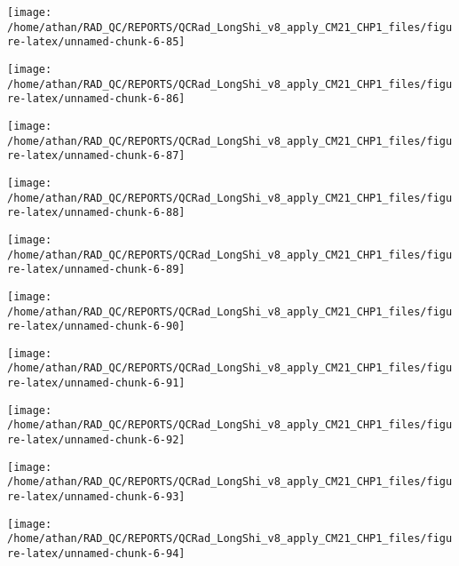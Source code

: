 \documentclass[
  10pt,
  a4paper,oneside]{article}
\begin{document}
\begin{center}\texttt{[image: /home/athan/RAD\_QC/REPORTS/QCRad\_LongShi\_v8\_apply\_CM21\_CHP1\_files/figure-latex/unnamed-chunk-6-85]} \end{center}

\begin{center}\texttt{[image: /home/athan/RAD\_QC/REPORTS/QCRad\_LongShi\_v8\_apply\_CM21\_CHP1\_files/figure-latex/unnamed-chunk-6-86]} \end{center}

\begin{center}\texttt{[image: /home/athan/RAD\_QC/REPORTS/QCRad\_LongShi\_v8\_apply\_CM21\_CHP1\_files/figure-latex/unnamed-chunk-6-87]} \end{center}

\begin{center}\texttt{[image: /home/athan/RAD\_QC/REPORTS/QCRad\_LongShi\_v8\_apply\_CM21\_CHP1\_files/figure-latex/unnamed-chunk-6-88]} \end{center}

\begin{center}\texttt{[image: /home/athan/RAD\_QC/REPORTS/QCRad\_LongShi\_v8\_apply\_CM21\_CHP1\_files/figure-latex/unnamed-chunk-6-89]} \end{center}

\begin{center}\texttt{[image: /home/athan/RAD\_QC/REPORTS/QCRad\_LongShi\_v8\_apply\_CM21\_CHP1\_files/figure-latex/unnamed-chunk-6-90]} \end{center}

\begin{center}\texttt{[image: /home/athan/RAD\_QC/REPORTS/QCRad\_LongShi\_v8\_apply\_CM21\_CHP1\_files/figure-latex/unnamed-chunk-6-91]} \end{center}

\begin{center}\texttt{[image: /home/athan/RAD\_QC/REPORTS/QCRad\_LongShi\_v8\_apply\_CM21\_CHP1\_files/figure-latex/unnamed-chunk-6-92]} \end{center}

\begin{center}\texttt{[image: /home/athan/RAD\_QC/REPORTS/QCRad\_LongShi\_v8\_apply\_CM21\_CHP1\_files/figure-latex/unnamed-chunk-6-93]} \end{center}

\begin{center}\texttt{[image: /home/athan/RAD\_QC/REPORTS/QCRad\_LongShi\_v8\_apply\_CM21\_CHP1\_files/figure-latex/unnamed-chunk-6-94]} \end{center}
\end{document}
